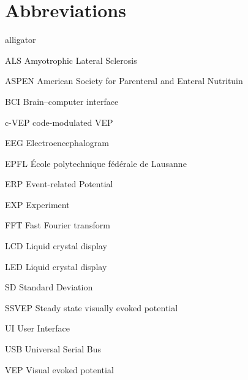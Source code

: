 \chapter{Abbreviations}
\begin{labeling}{alligator}
	\item[ALS]	Amyotrophic Lateral Sclerosis
	\item[ASPEN] American Society for Parenteral and Enteral Nutrituin
	\item[BCI] Brain–computer interface
	\item[c-VEP] code-modulated VEP
	\item[EEG] Electroencephalogram
	\item[EPFL] École polytechnique fédérale de Lausanne
	\item[ERP] Event-related Potential
	\item[EXP] Experiment
	\item[FFT] Fast Fourier transform
	\item[LCD] Liquid crystal display
	\item[LED] Liquid crystal display
	\item[SD] Standard Deviation
	\item[SSVEP] Steady state visually evoked potential
	\item[UI] User Interface
	\item[USB] Universal Serial Bus
	\item[VEP] Visual evoked potential
	
\end{labeling}